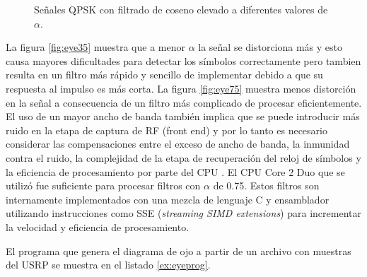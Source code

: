 \begin{figure}[htp]
    \ContinuedFloat
    \centering
    \vspace{0.3in}
    \caption{Se\~nales QPSK con filtrado de coseno elevado a diferentes valores de $\alpha$.}
    \label{fig:rrcsignals}
\end{figure}

La figura \ref{fig:eye35} muestra que a menor $\alpha$ la se\~nal se distorciona m\'as y esto causa mayores
dificultades para detectar los s\'imbolos correctamente pero tambien resulta en un filtro m\'as r\'apido y
sencillo de implementar debido a que su respuesta al impulso es m\'as corta. La figura
\ref{fig:eye75} muestra menos distorci\'on en la se\~nal a consecuencia de un filtro m\'as complicado de
procesar eficientemente. El uso de un mayor ancho de banda tambi\'en implica que se puede introducir m\'as
ruido en la etapa de captura de RF (front end) y por lo tanto es necesario considerar las
compensaciones entre el exceso de ancho de banda, la inmunidad contra el ruido, la complejidad de
la etapa de recuperaci\'on del reloj de s\'imbolos y la eficiencia de procesamiento por parte del CPU
\cite{lee}. El CPU Core 2 Duo que se utiliz\'o fue suficiente para procesar filtros con $\alpha$ de
0.75. Estos filtros son internamente implementados con una mezcla de lenguaje C y ensamblador utilizando
instrucciones como SSE (\emph{streaming SIMD extensions}) para incrementar la velocidad y eficiencia
de procesamiento.

El programa que genera el diagrama de ojo a partir de un archivo con muestras del USRP se muestra en
el listado \ref{ex:eyeprog}.

